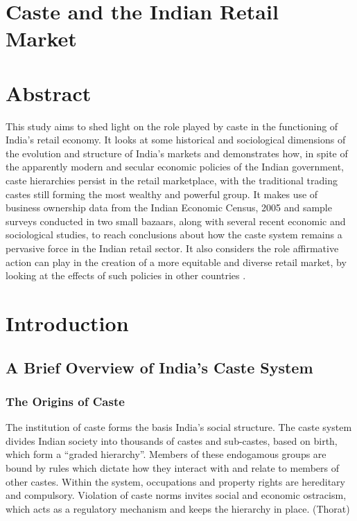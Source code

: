 \documentclass[]{article}
\date{}
\begin{document}
\section{Caste and the Indian Retail
Market}\label{caste-and-the-indian-retail-market}

\section{Abstract}\label{abstract}

This study aims to shed light on the role played by caste in the
functioning of India's retail economy. It looks at some historical and
sociological dimensions of the evolution and structure of India's
markets and demonstrates how, in spite of the apparently modern and
secular economic policies of the Indian government, caste hierarchies
persist in the retail marketplace, with the traditional trading castes
still forming the most wealthy and powerful group. It makes use of
business ownership data from the Indian Economic Census, 2005 and sample
surveys conducted in two small bazaars, along with several recent
economic and sociological studies, to reach conclusions about how the
caste system remains a pervasive force in the Indian retail sector. It
also considers the role affirmative action can play in the creation of a
more equitable and diverse retail market, by looking at the effects of
such policies in other countries .

\section{Introduction}\label{introduction}

\subsection{A Brief Overview of India's Caste
System}\label{a-brief-overview-of-indias-caste-system}

\subsubsection{The Origins of Caste}\label{the-origins-of-caste}

The institution of caste forms the basis India's social structure. The
caste system divides Indian society into thousands of castes and
sub-castes, based on birth, which form a ``graded hierarchy''. Members
of these endogamous groups are bound by rules which dictate how they
interact with and relate to members of other castes. Within the system,
occupations and property rights are hereditary and compulsory. Violation
of caste norms invites social and economic ostracism, which acts as a
regulatory mechanism and keeps the hierarchy in place. (Thorat)
\end{document}
